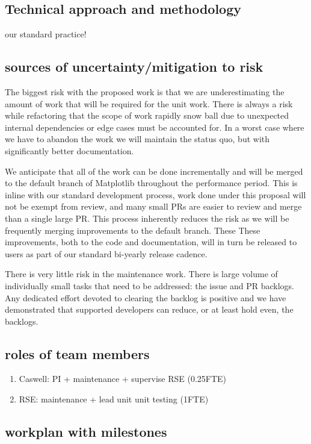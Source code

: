 \documentclass[12pt]{article}
\numberwithin{page}{section}
\begin{document}
\subsection{Technical approach and methodology}

our standard practice!

\subsection{sources of uncertainty/mitigation to risk}


The biggest risk with the proposed work is that we are underestimating
the amount of work that will be required for the unit work.  There is
always a risk while refactoring that the scope of work rapidly snow
ball due to unexpected internal dependencies or edge cases must be
accounted for.  In a worst case where we have to abandon the work we
will maintain the status quo, but with significantly better
documentation.

We anticipate that all of the work can be done incrementally and will
be merged to the default branch of Matplotlib throughout the
performance period.  This is inline with our standard development
process, work done under this proposal will not be exempt from review,
and many small PRs are easier to review and merge than a single large
PR.  This process inherently reduces the risk as we will be frequently
merging improvements to the default branch.  These These improvements,
both to the code and documentation, will in turn be released to users
as part of our standard bi-yearly release cadence.

There is very little risk in the maintenance work.  There is large
volume of individually small tasks that need to be addressed: the
issue and PR backlogs.  Any dedicated effort devoted to clearing the
backlog is positive and we have demonstrated that supported developers
can reduce, or at least hold even, the backlogs.


\subsection{roles of team members}
\begin{enumerate}
\item Caswell: PI + maintenance + supervise RSE (0.25FTE)
\item RSE: maintenance + lead unit unit testing (1FTE)
\end{enumerate}

\subsection{workplan with milestones}
\end{document}
